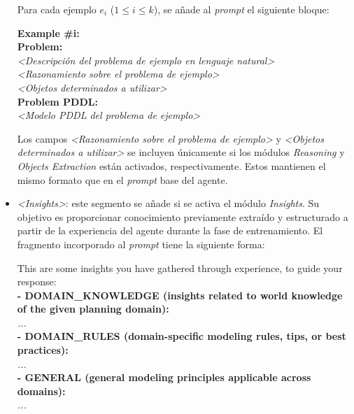 \begin{anexes}
\begin{itemize}
    Para cada ejemplo $e_i$ ($1 \leq i \leq k$), se añade al \textit{prompt} el siguiente bloque:

    \begin{tcolorbox}[colback=gray!10!white, colframe=black, title=\textit{Prompt} base del agente modelador propuesto, fonttitle=\bfseries, breakable]
    \textbf{Example \#i:} \\
    \textbf{Problem:} \\
    \textit{<Descripción del problema de ejemplo en lenguaje natural>} \\

    \textit{<Razonamiento sobre el problema de ejemplo>} \\

    \textit{<Objetos determinados a utilizar>} \\

    \textbf{Problem PDDL:} \\
    \textit{<Modelo PDDL del problema de ejemplo>}
    \end{tcolorbox}

    Los campos \textit{<Razonamiento sobre el problema de ejemplo>} y \textit{<Objetos determinados a utilizar>} se incluyen únicamente si los módulos \textit{Reasoning} y \textit{Objects Extraction} están activados, respectivamente. Estos mantienen el mismo formato que en el \textit{prompt} base del agente.

    \item \textit{<Insights>}: este segmento se añade si se activa el módulo \textit{Insights}. Su objetivo es proporcionar conocimiento previamente extraído y estructurado a partir de la experiencia del agente durante la fase de entrenamiento. El fragmento incorporado al \textit{prompt} tiene la siguiente forma:

    \begin{tcolorbox}[colback=gray!10!white, colframe=black, title=Bloque de \textit{insights}, fonttitle=\bfseries, breakable]
    This are some insights you have gathered through experience, to guide your response: \\
    \textbf{- DOMAIN\_KNOWLEDGE (insights related to world knowledge of the given planning domain):} \\
    \textit{...} \\
    \textbf{- DOMAIN\_RULES (domain-specific modeling rules, tips, or best practices):} \\
    \textit{...} \\
    \textbf{- GENERAL (general modeling principles applicable across domains):} \\
    \textit{...} \\


\end{tcolorbox}
\end{itemize}
\end{anexes}
